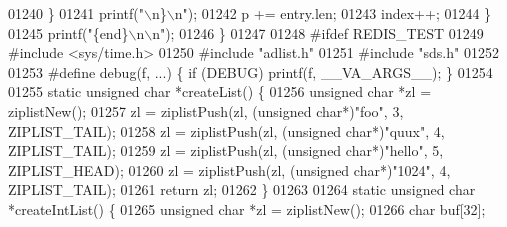 \begin{DoxyCode}
{{{{{{{{{{{{{{{01240         \}
01241         printf(\textcolor{stringliteral}{"\(\backslash\)n\}\(\backslash\)n"});
01242         p += entry.len;
01243         index++;
01244     \}
01245     printf(\textcolor{stringliteral}{"\{end\}\(\backslash\)n\(\backslash\)n"});
01246 \}
01247 
01248 \textcolor{preprocessor}{#}\textcolor{preprocessor}{ifdef} \textcolor{preprocessor}{REDIS\_TEST}
01249 \textcolor{preprocessor}{#}\textcolor{preprocessor}{include} \textcolor{preprocessor}{<}\textcolor{preprocessor}{sys}\textcolor{preprocessor}{/}\textcolor{preprocessor}{time}\textcolor{preprocessor}{.}\textcolor{preprocessor}{h}\textcolor{preprocessor}{>}
01250 \textcolor{preprocessor}{#}\textcolor{preprocessor}{include} \textcolor{stringliteral}{"adlist.h"}
01251 \textcolor{preprocessor}{#}\textcolor{preprocessor}{include} \textcolor{stringliteral}{"sds.h"}
01252 
01253 \textcolor{preprocessor}{#}\textcolor{preprocessor}{define} \textcolor{preprocessor}{debug}\textcolor{preprocessor}{(}\textcolor{preprocessor}{f}\textcolor{preprocessor}{,} \textcolor{preprocessor}{...}\textcolor{preprocessor}{)} \textcolor{preprocessor}{\{} \textcolor{preprocessor}{if} \textcolor{preprocessor}{(}\textcolor{preprocessor}{DEBUG}\textcolor{preprocessor}{)} \textcolor{preprocessor}{printf}\textcolor{preprocessor}{(}\textcolor{preprocessor}{f}\textcolor{preprocessor}{,} \textcolor{preprocessor}{\_\_VA\_ARGS\_\_}\textcolor{preprocessor}{)}\textcolor{preprocessor}{;} \textcolor{preprocessor}{\}}
01254 
01255 \textcolor{keyword}{static} \textcolor{keywordtype}{unsigned} \textcolor{keywordtype}{char} *createList() \{
01256     \textcolor{keywordtype}{unsigned} \textcolor{keywordtype}{char} *zl = ziplistNew();
01257     zl = ziplistPush(zl, (\textcolor{keywordtype}{unsigned} \textcolor{keywordtype}{char}*)\textcolor{stringliteral}{"foo"}, 3, ZIPLIST\_TAIL);
01258     zl = ziplistPush(zl, (\textcolor{keywordtype}{unsigned} \textcolor{keywordtype}{char}*)\textcolor{stringliteral}{"quux"}, 4, ZIPLIST\_TAIL);
01259     zl = ziplistPush(zl, (\textcolor{keywordtype}{unsigned} \textcolor{keywordtype}{char}*)\textcolor{stringliteral}{"hello"}, 5, ZIPLIST\_HEAD);
01260     zl = ziplistPush(zl, (\textcolor{keywordtype}{unsigned} \textcolor{keywordtype}{char}*)\textcolor{stringliteral}{"1024"}, 4, ZIPLIST\_TAIL);
01261     \textcolor{keywordflow}{return} zl;
01262 \}
01263 
01264 \textcolor{keyword}{static} \textcolor{keywordtype}{unsigned} \textcolor{keywordtype}{char} *createIntList() \{
01265     \textcolor{keywordtype}{unsigned} \textcolor{keywordtype}{char} *zl = ziplistNew();
01266     \textcolor{keywordtype}{char} buf[32];
}}}}}}}}}}}}}}}
\end{DoxyCode}
